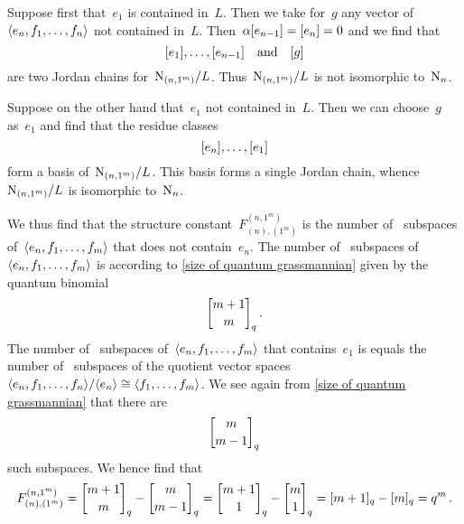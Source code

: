 \documentclass[a4paper,11pt]{scrartcl}
\begin{document}
Suppose first that~$e_1$ is contained in~$L$.
Then we take for~$g$ any vector of~$\langle e_n, f_1, \dotsc, f_n\rangle$ not contained in~$L$.
Then~$\alpha [e_{n-1}] = [e_n] = 0$ and we find that
\[
  [e_1], \dotsc, [e_{n-1}]
  \quad
  \text{and}
  \quad
  [g]
\]
are two Jordan chains for~$\mathrm{N}_{(n, 1^m)} / L$.
Thus~$\mathrm{N}_{(n, 1^m)} / L$ is not isomorphic to~$\mathrm{N}_n$.

Suppose on the other hand that~$e_1$ not contained in~$L$.
Then we can choose~$g$ as~$e_1$ and find that the residue classes
\[
  [e_n], \dotsc, [e_1]
\]
form a basis of~$\mathrm{N}_{(n, 1^m)} / L$.
This basis forms a single Jordan chain, whence~$\mathrm{N}_{(n, 1^m)} / L$ is isomorphic to~$\mathrm{N}_n$.

We thus find that the structure constant~$F^{(n, 1^m)}_{(n), (1^m)}$ is the number of~ subspaces of~$\langle e_n, f_1, \dotsc, f_m\rangle$ that does not contain~$e_n$.
The number of~ subspaces of~$\langle e_n, f_1, \dotsc, f_m\rangle$ is according to \cref{size of quantum grassmannian} given by the quantum binomial
\[
  \qbinom{m+1}{m}_q \,.
\]
The number of~ subspaces of~$\langle e_n, f_1, \dotsc, f_m\rangle$ that contains~$e_1$ is equals the number of~ subspaces of the quotient vector spaces~$\langle e_n, f_1, \dotsc, f_n\rangle / \langle e_n\rangle \cong \langle f_1, \dotsc, f_m\rangle$.
We see again from \cref{size of quantum grassmannian} that there are
\[
  \qbinom{m}{m-1}_q
\]
such subspaces.
We hence find that
\[
  F^{(n, 1^m)}_{(n), (1^m)}
  =
  \qbinom{m+1}{m}_q - \qbinom{m}{m-1}_q
  =
  \qbinom{m+1}{1}_q - \qbinom{m}{1}_q
  =
  \qnum{m+1}_q - \qnum{m}_q
  =
  q^m \,.
\]


%
%
\end{document}
